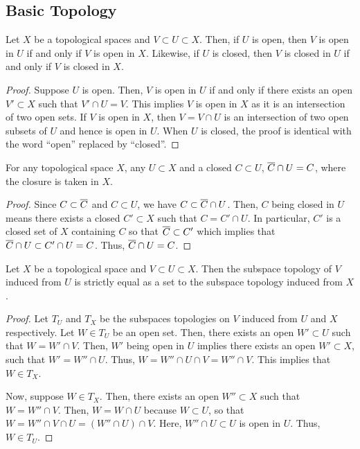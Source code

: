 
\subsection{Basic Topology}

\begin{cor}\label{cor:op-op-cls-cls}
Let $X$ be a topological spaces and $V \subset U \subset X$.
Then, if $U$ is open, then
$V$ is open in $U$ if and only if $V$ is open in
$X$. Likewise, if $U$ is closed, then
$V$ is closed in $U$ if and only if $V$
is closed in $X$.
\end{cor}
\begin{proof}
Suppose $U$ is open. Then,
$V$ is open in $U$ if and only if there exists an open
$V' \subset X$ such that $V' \cap U = V$. This implies
$V$ is open in $X$ as it is an intersection of two open
sets. If $V$ is open in $X$, then $V = V \cap U$
is an intersection of two open subsets of $U$ and hence
is open in $U$. When $U$ is closed, the proof is identical
with the word ``open'' replaced by ``closed''.
\end{proof}

\begin{lem}\label{lem:cls-int-id}
For any topological space $X$, any $U \subset X$ and
a closed $C \subset U$, $\cls{C} \cap U = C$, where the closure is taken
in $X$.
\end{lem}
\begin{proof}
Since $C \subset \cls{C}$
and $C \subset U$, we have $C \subset \cls{C} \cap U$.
Then, $C$ being closed in $U$ means there exists a closed $C' \subset X$
such that $C = C' \cap U$. In particular, $C'$ is a closed set of $X$
containing $C$ so that $\cls{C} \subset C'$ which implies that
$\cls{C} \cap U \subset C' \cap U = C$. Thus, $\cls{C} \cap U = C$.
\end{proof}

\begin{lem}\label{lem:sub-sub-topology}
Let $X$ be a topological space and $V \subset U \subset X$.
Then the subspace topology of $V$ induced from $U$
is strictly equal as a set to the subspace topology induced from $X$.
\end{lem}
\begin{proof}
Let $T_U$ and $T_X$ be the subspaces topologies on $V$
induced from $U$ and $X$ respectively.
Let $W \in T_U$ be an open set. Then, there exists an open
$W' \subset U$ such that $W = W' \cap V$.
Then, $W'$ being open in $U$ implies there exists an open
$W' \subset X$, such that $W' = W'' \cap U$. Thus,
$W = W'' \cap U \cap V = W'' \cap V$. This implies that
$W \in T_X$.

Now, suppose $W \in T_X$. Then, there exists an open $W'' \subset X$
such that $W = W'' \cap V$. Then, $W = W \cap U$ because $W \subset U$,
so that $W = W'' \cap V \cap U = (W'' \cap U) \cap V$. Here,
$W'' \cap U \subset U$ is open in $U$. Thus, $W \in T_U$.
\end{proof}

